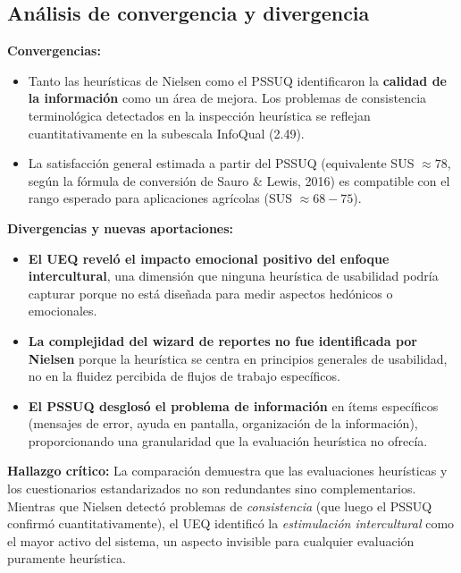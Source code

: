 \documentclass[a4paper,12pt]{report}
\begin{document}
\subsection{Análisis de convergencia y divergencia}

\textbf{Convergencias:}
\begin{itemize}
    \item Tanto las heurísticas de Nielsen como el PSSUQ identificaron la \textbf{calidad de la información} como un área de mejora. Los problemas de consistencia terminológica detectados en la inspección heurística se reflejan cuantitativamente en la subescala InfoQual (2.49).
    \item La satisfacción general estimada a partir del PSSUQ (equivalente SUS $\approx 78$, según la fórmula de conversión de Sauro \& Lewis, 2016) es compatible con el rango esperado para aplicaciones agrícolas (SUS $\approx 68-75$).
\end{itemize}

\textbf{Divergencias y nuevas aportaciones:}
\begin{itemize}
    \item \textbf{El UEQ reveló el impacto emocional positivo del enfoque intercultural}, una dimensión que ninguna heurística de usabilidad podría capturar porque no está diseñada para medir aspectos hedónicos o emocionales.
    \item \textbf{La complejidad del wizard de reportes no fue identificada por Nielsen} porque la heurística se centra en principios generales de usabilidad, no en la fluidez percibida de flujos de trabajo específicos.
    \item \textbf{El PSSUQ desglosó el problema de información} en ítems específicos (mensajes de error, ayuda en pantalla, organización de la información), proporcionando una granularidad que la evaluación heurística no ofrecía.
\end{itemize}

\begin{warningbox}
\textbf{Hallazgo crítico:} La comparación demuestra que las evaluaciones heurísticas y los cuestionarios estandarizados no son redundantes sino complementarios. Mientras que Nielsen detectó problemas de \textit{consistencia} (que luego el PSSUQ confirmó cuantitativamente), el UEQ identificó la \textit{estimulación intercultural} como el mayor activo del sistema, un aspecto invisible para cualquier evaluación puramente heurística.
\end{warningbox}
\end{document}
